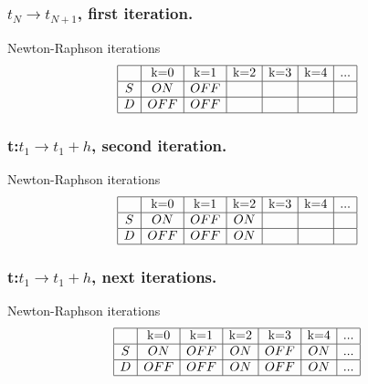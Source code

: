 \frame
{

\frametitle{$t_N \to t_{N+1}$, first iteration.}
  \begin{figure}[!h]
   \centerline{
   \scalebox{0.9}{
    
    }
 } 
 \end{figure}
  \begin{block}{Newton-Raphson iterations}
\begin{equation}
\begin{array}{|c|c|c|c|c|c|c|}
\hline
&$k=0$&$k=1$&$k=2$&$k=3$&$k=4$&...\\
\hline
S&ON&OFF&&&&\\
\hline
D&OFF&OFF&&&&\\
\hline
\end{array}
\end{equation}
\end{block}

 }
  \frame
{

\frametitle{t:$t_1 \to t_1+h$, second iteration.}
  \begin{figure}[!h]
   \centerline{
   \scalebox{0.9}{
    
    }
 } 
 \end{figure}
  \begin{block}{Newton-Raphson iterations}
\begin{equation}
\begin{array}{|c|c|c|c|c|c|c|}
\hline
&$k=0$&$k=1$&$k=2$&$k=3$&$k=4$&...\\
\hline
S&ON&OFF&ON&&&\\
\hline
D&OFF&OFF&ON&&&\\
\hline
\end{array}
\end{equation}
\end{block}


 }
  \frame
{

\frametitle{t:$t_1 \to t_1+h$, next iterations.}
  \begin{figure}[!h]
   \centerline{
   \scalebox{0.9}{
    
    }
 } 
 \end{figure}
   \begin{block}{Newton-Raphson iterations}
\begin{equation}
\begin{array}{|c|c|c|c|c|c|c|}
\hline
&$k=0$&$k=1$&$k=2$&$k=3$&$k=4$&...\\
\hline
S&ON&OFF&ON&OFF&ON&...\\
\hline
D&OFF&OFF&ON&OFF&ON&...\\
\hline
\end{array}
\end{equation}
\end{block}

 }

